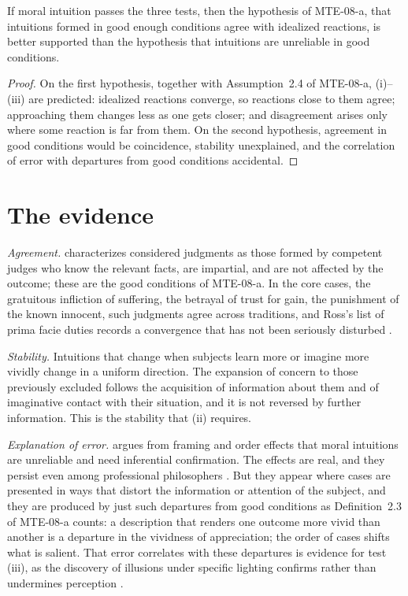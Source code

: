 \documentclass{situationist-preprint}
\begin{document}
\begin{proposition}\label{p:cal}
If moral intuition passes the three tests, then the hypothesis of MTE-08-a, that intuitions formed in good enough conditions agree with idealized reactions, is better supported than the hypothesis that intuitions are unreliable in good conditions.
\end{proposition}

\begin{proof}
On the first hypothesis, together with Assumption~2.4 of MTE-08-a, (i)--(iii) are predicted: idealized reactions converge, so reactions close to them agree; approaching them changes less as one gets closer; and disagreement arises only where some reaction is far from them. On the second hypothesis, agreement in good conditions would be coincidence, stability unexplained, and the correlation of error with departures from good conditions accidental.
\end{proof}

\section{The evidence}\label{s:ev}

\emph{Agreement.} \citet{Rawls1951} characterizes considered judgments as those formed by competent judges who know the relevant facts, are impartial, and are not affected by the outcome; these are the good conditions of MTE-08-a. In the core cases, the gratuitous infliction of suffering, the betrayal of trust for gain, the punishment of the known innocent, such judgments agree across traditions, and Ross's list of prima facie duties records a convergence that has not been seriously disturbed \citep{Ross1930}.

\emph{Stability.} Intuitions that change when subjects learn more or imagine more vividly change in a uniform direction. The expansion of concern to those previously excluded follows the acquisition of information about them and of imaginative contact with their situation, and it is not reversed by further information. This is the stability that (ii) requires.

\emph{Explanation of error.} \citet{SinnottArmstrong2008} argues from framing and order effects that moral intuitions are unreliable and need inferential confirmation. The effects are real, and they persist even among professional philosophers \citep{SchwitzgebelCushman2012}. But they appear where cases are presented in ways that distort the information or attention of the subject, and they are produced by just such departures from good conditions as Definition~2.3 of MTE-08-a counts: a description that renders one outcome more vivid than another is a departure in the vividness of appreciation; the order of cases shifts what is salient. That error correlates with these departures is evidence for test (iii), as the discovery of illusions under specific lighting confirms rather than undermines perception \citep[ch.~5]{Huemer2005}.
\end{document}
